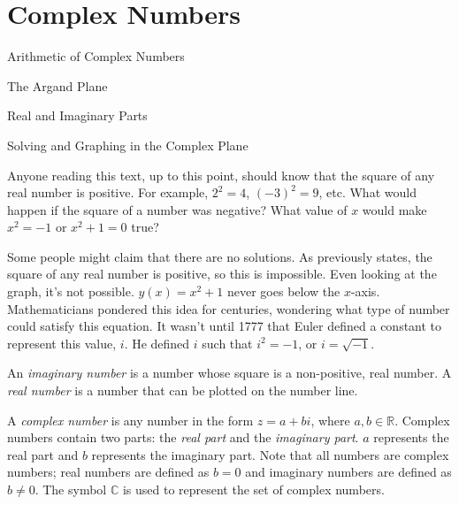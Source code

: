 \documentclass[../book.tex]{subfiles}
\begin{document}
\chapter{Complex Numbers}
\begin{introduction}[Contents]
\item Arithmetic of Complex Numbers
\item The Argand Plane
\item Real and Imaginary Parts
\item Solving and Graphing in the Complex Plane
\end{introduction}
\noindent Anyone reading this text, up to this point, should know that the square of any real number is positive.  For example, $2^2=4$, $(-3)^2=9$, etc.  What would happen if the square of a number was negative?  What value of $x$ would make $x^2=-1$ or $x^2+1=0$ true?

Some people might claim that there are no solutions.  As previously states, the square of any real number is positive, so this is impossible.  Even looking at the graph, it's not possible.  $y(x)=x^2+1$ never goes below the $x$-axis.  Mathematicians pondered this idea for centuries, wondering what type of number could satisfy this equation.  It wasn't until 1777 that Euler defined a constant to represent this value, $i$.  He defined $i$ such that $i^2=-1$, or $i=\sqrt{-1}$.

An \textit{imaginary number} is a number whose square is a non-positive, real number.  A \textit{real number} is a number that can be plotted on the number line.

A \textit{complex number} is any number in the form $z=a+bi$, where $a,b\in\mathbb{R}$.  Complex numbers contain two parts: the \textit{real part} and the \textit{imaginary part}.  $a$ represents the real part and $b$ represents the imaginary part.  Note that all numbers are complex numbers; real numbers are defined as $b=0$ and imaginary numbers are defined as $b\neq 0$.  The symbol $\mathbb{C}$ is used to represent the set of complex numbers.
\end{document}
